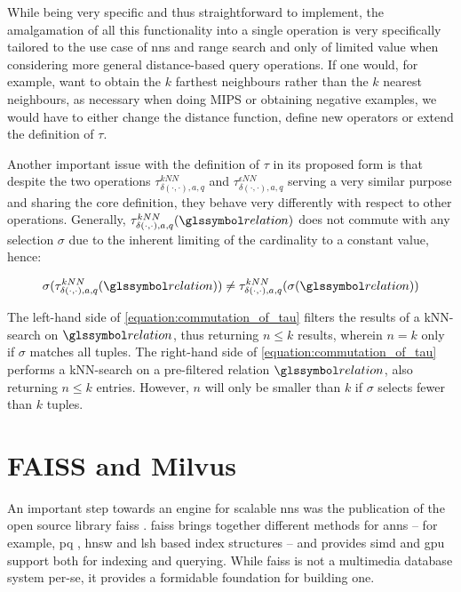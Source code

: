 While being very specific and thus straightforward to implement, the amalgamation of all this functionality into a single operation is very specifically tailored to the use case of \acrshort{nns} and range search and only of limited value when considering more general distance-based query operations. If one would, for example, want to obtain the $k$ farthest neighbours rather than the $k$ nearest neighbours, as necessary when doing MIPS or obtaining negative examples, we would have to either change the distance function, define new operators or extend the definition of $\tau$. 

Another important issue with the definition of $\tau$ in its proposed form is that despite the two operations $\tau^{kNN}_{\delta(\cdot,\cdot),a,q}$ and $\tau^{\epsilon NN}_{\delta(\cdot,\cdot),a,q}$ serving a very similar purpose and sharing the core definition, they behave very differently with respect to other operations. Generally, $\tau^{kNN}_{\delta(\cdot,\cdot),a,q}(\relation)$ does not commute with any selection $\sigma$ due to the inherent limiting of the cardinality to a constant value, hence:

\begin{equation}
    \label{equation:commutation_of_tau}
    \sigma(\tau^{kNN}_{\delta(\cdot,\cdot),a,q}(\relation)) \neq \tau^{kNN}_{\delta(\cdot,\cdot),a,q}(\sigma(\relation))
\end{equation}

The left-hand side of \cref{equation:commutation_of_tau} filters the results of a kNN-search on $\relation$, thus returning $n \leq k$ results, wherein $n = k$ only if $\sigma$ matches all tuples. The right-hand side of \cref{equation:commutation_of_tau} performs a kNN-search on a pre-filtered relation $\relation$, also returning $n \leq k$ entries. However, $n$ will only be smaller than $k$ if $\sigma$ selects fewer than $k$ tuples.

\section{FAISS and Milvus}

An important step towards an engine for scalable \acrshort{nns} was the publication of the open source library \acrfull{faiss} \cite{Johnson:2019Billion}. \acrshort{faiss} brings together different methods for \acrshort{anns} -- for example, \acrshort{pq} \cite{Jegou:2010Product}, \acrshort{hnsw} \cite{Malkov:2018Efficient} and \acrshort{lsh} \cite{Indyk1998:Approximate} based index structures -- and provides  \acrshort{simd} and \acrshort{gpu} support both for indexing and querying. While \acrshort{faiss} is not a multimedia database system per-se, it provides a formidable foundation for building one.

